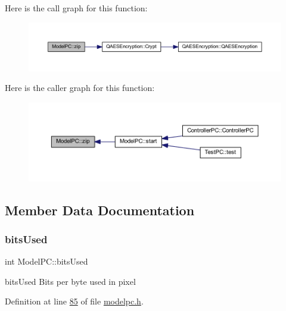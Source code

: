 Here is the call graph for this function\+:
\nopagebreak
\begin{figure}[H]
\begin{center}
\leavevmode
\includegraphics[width=350pt]{class_model_p_c_afebbbfa4b07deba4f68fc6dfb50f353f_cgraph}
\end{center}
\end{figure}
Here is the caller graph for this function\+:
\nopagebreak
\begin{figure}[H]
\begin{center}
\leavevmode
\includegraphics[width=350pt]{class_model_p_c_afebbbfa4b07deba4f68fc6dfb50f353f_icgraph}
\end{center}
\end{figure}


\subsection{Member Data Documentation}
\mbox{\label{class_model_p_c_a655deb6a8afa94c7f4aadb3056989038}} 
\subsubsection{\texorpdfstring{bits\+Used}{bitsUsed}}
{\footnotesize\ttfamily int Model\+P\+C\+::bits\+Used}



bits\+Used Bits per byte used in pixel 



Definition at line \mbox{\hyperlink{modelpc_8h_source_l00085}{85}} of file \mbox{\hyperlink{modelpc_8h_source}{modelpc.\+h}}.

\mbox{\label{class_model_p_c_ad74974ac236182c1d6d2cf0729fac3dd}} 
